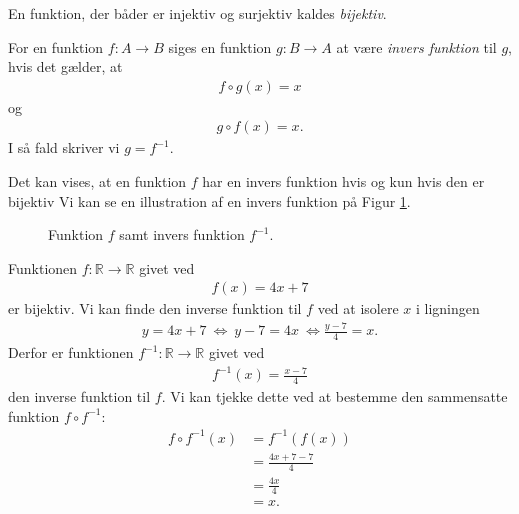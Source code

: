 \begin{defn}
	En funktion, der båder er injektiv og surjektiv kaldes \textit{bijektiv}.
\end{defn}
\newpage
\begin{defn}
	For en funktion $f:A\to B$ siges en funktion $g:B\to A$ at være \textit{invers funktion} til $g$, hvis det gælder, 
	at 
	\begin{align*}
		f\circ g (x) = x
	\end{align*}
	og
	\begin{align*}
		g \circ f(x) = x.
	\end{align*}
	I så fald skriver vi $g = f^{-1}$.
\end{defn}
Det kan vises, at en funktion $f$ har en invers funktion hvis og kun hvis den er bijektiv
Vi kan se en illustration af en invers funktion på Figur \ref{fig:inv}. 
\begin{figure}[H]
	\centering
	\caption{Funktion $f$ samt invers funktion $f^{-1}$.}
	\label{fig:inv}
\end{figure}
\begin{exa}
Funktionen $f: \mathbb{R} \to \mathbb{R}$ givet ved
\begin{align*}
	f(x) = 4x+7
\end{align*}
er bijektiv. Vi kan finde den inverse funktion til $f$ ved at isolere $x$ i ligningen
\begin{align*}
	y = 4x+7 \ \Leftrightarrow \ y-7 = 4x \ \Leftrightarrow \frac{y-7}{4} = x.
\end{align*}
Derfor er funktionen $f^{-1}:\mathbb{R} \to \mathbb{R}$ givet ved
\begin{align*}
	f^{-1}(x) = \frac{x-7}{4}
\end{align*}
den inverse funktion til $f$. Vi kan tjekke dette ved at bestemme den sammensatte funktion $f\circ f^{-1}$:
\begin{align*}
f\circ f^{-1}(x) &= f^{-1}(f(x))\\
&= \frac{4x+7-7}{4}\\
&= \frac{4x}{4}\\
&= x.
\end{align*}
\end{exa}

